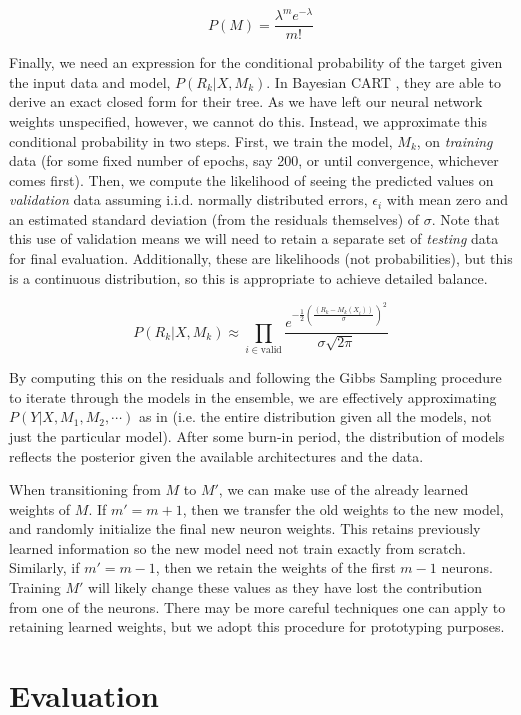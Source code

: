 \documentclass[12pt]{article}
\begin{document}
$$
P(M) = \frac{\lambda^m e^{-\lambda}}{m!}
$$

Finally, we need an expression for the conditional probability of the target given the input data and model, $P(R_k|X,M_k)$.  In Bayesian CART \cite{chipman1998bayesian}, they are able to derive an exact closed form for their tree.  As we have left our neural network weights unspecified, however, we cannot do this.  Instead, we approximate this conditional probability in two steps.  First, we train the model, $M_k$, on \emph{training} data (for some fixed number of epochs, say 200, or until convergence, whichever comes first).  Then, we compute the likelihood of seeing the predicted values on \emph{validation} data assuming i.i.d. normally distributed errors, $\epsilon_i$ with mean zero and an estimated standard deviation (from the residuals themselves) of $\sigma$.  Note that this use of validation means we will need to retain a separate set of \emph{testing} data for final evaluation.  Additionally, these are likelihoods (not probabilities), but this is a continuous distribution, so this is appropriate to achieve detailed balance.

$$
P(R_k|X,M_k) \approx \prod_{i \in \text{valid}} \frac{e^{-\frac{1}{2}\left(\frac{(R_k-M_k(X_i))}{\sigma}\right)^2}}{\sigma \sqrt{2\pi}}
$$

By computing this on the residuals and following the Gibbs Sampling procedure to iterate through the models in the ensemble, we are effectively approximating $P(Y|X,M_1,M_2,\cdots)$ as in \cite{chipman2010bart} (i.e. the entire distribution given all the models, not just the particular model).  After some burn-in period, the distribution of models reflects the posterior given the available architectures and the data.

When transitioning from $M$ to $M'$, we can make use of the already learned weights of $M$.  If $m' = m+1$, then we transfer the old weights to the new model, and randomly initialize the final new neuron weights.  This retains previously learned information so the new model need not train exactly from scratch.  Similarly, if $m' = m-1$, then we retain the weights of the first $m-1$ neurons.  Training $M'$ will likely change these values as they have lost the contribution from one of the neurons.  There may be more careful techniques one can apply to retaining learned weights, but we adopt this procedure for prototyping purposes.

\section{Evaluation}\label{sec:eval}
\end{document}
